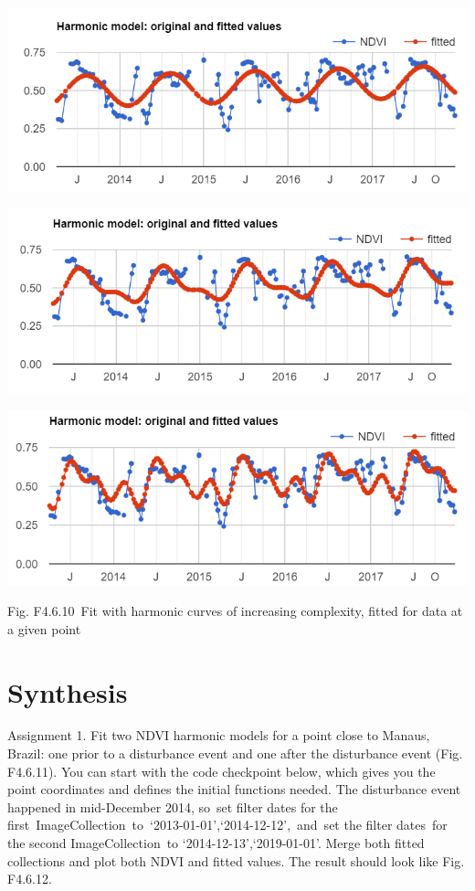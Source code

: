 \documentclass[
  letterpaper,
  DIV=11,
  numbers=noendperiod]{scrreprt}
\begin{document}
\includegraphics{./F4/image24.png}

\includegraphics{./F4/image35.png}

\includegraphics{./F4/image64.png}

Fig. F4.6.10~Fit with harmonic curves of increasing complexity, fitted
for data at a given point~

\hypertarget{synthesis-9}{%
\section*{Synthesis}\label{synthesis-9}}


Assignment 1. Fit two NDVI harmonic models for a point close to Manaus,
Brazil: one prior to a disturbance event and one after the disturbance
event (Fig. F4.6.11). You can start with the code checkpoint below,
which gives you the point coordinates and defines the initial functions
needed. The disturbance event happened in mid-December 2014, so~set
filter dates for the
first~ImageCollection~to~`2013-01-01',`2014-12-12',~and~set the filter
dates~for the second ImageCollection~to `2014-12-13',`2019-01-01'. Merge
both fitted collections and plot both NDVI and fitted values. The result
should look like Fig. F4.6.12.
\end{document}
